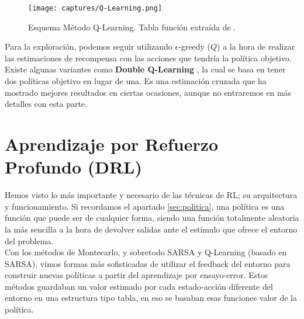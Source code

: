\documentclass[11pt,fleqn]{book} %
\begin{document}
\begin{figure}[H]
	\centering\texttt{[image: captures/Q-Learning.png]}
	\caption{Esquema Método Q-Learning. Tabla función extraída de \cite{article:RLromero}.}
	\label{fig:qlearning} %
\end{figure}

Para la exploración, podemos seguir utilizando $\epsilon$-greedy ($Q$) a la hora de realizar las estimaciones de recompensa con las acciones que tendría la política objetivo. \\

Existe algunas variantes como \textbf{Double Q-Learning} \cite{article:DoubleQLearning}, la cual se basa en tener dos políticas objetivo en lugar de una. Es una estimación cruzada que ha mostrado mejores resultados en ciertas ocasiones, aunque no entraremos en más detalles con esta parte. \\


\chapter{Aprendizaje por Refuerzo Profundo (DRL)}

Hemos visto lo más importante y necesario de las técnicas de RL; su arquitectura y funcionamiento. Si recordamos el apartado \ref{sec:politica}, una política es una función que puede ser de cualquier forma, siendo una función totalmente aleatoria la más sencilla a la hora de devolver salidas ante el estímulo que ofrece el entorno del problema. \\

Con los métodos de Montecarlo, y sobretodo SARSA y Q-Learning (basado en SARSA), vimos formas más sofisticadas de utilizar el feedback del entorno para construir nuevas políticas a partir del aprendizaje por ensayo-error. Estos métodos guardaban un valor estimado por cada estado-acción diferente del entorno en una estructura tipo tabla, en eso se basaban esas funciones valor de la política. \\
\end{document}
